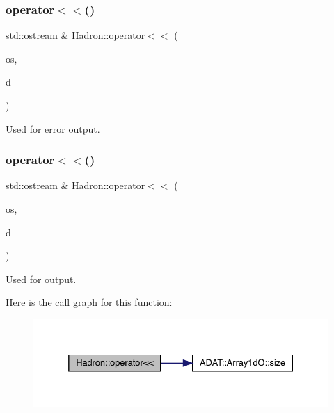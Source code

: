 \subsubsection{\texorpdfstring{operator$<$$<$()}{operator<<()}\hspace{0.1cm}{\footnotesize\ttfamily [25/48]}}
{\footnotesize\ttfamily std\+::ostream \& Hadron\+::operator$<$$<$ (\begin{DoxyParamCaption}\item[{std\+::ostream \&}]{os,  }\item[{const \mbox{\hyperlink{structHadron_1_1KeyGlueElementalOperator__t}{Key\+Glue\+Elemental\+Operator\+\_\+t}} \&}]{d }\end{DoxyParamCaption})}



Used for error output. 

\mbox{\label{namespaceHadron_a43b2528d47caea41d1eca554b9106b9c}} 
\subsubsection{\texorpdfstring{operator$<$$<$()}{operator<<()}\hspace{0.1cm}{\footnotesize\ttfamily [26/48]}}
{\footnotesize\ttfamily std\+::ostream \& Hadron\+::operator$<$$<$ (\begin{DoxyParamCaption}\item[{std\+::ostream \&}]{os,  }\item[{const \mbox{\hyperlink{classADAT_1_1Array1dO}{Array1dO}}$<$ \mbox{\hyperlink{structHadron_1_1KeyHadronNPartIrrepOp__t_1_1CGPair__t}{Key\+Hadron\+N\+Part\+Irrep\+Op\+\_\+t\+::\+C\+G\+Pair\+\_\+t}} $>$ \&}]{d }\end{DoxyParamCaption})}



Used for output. 

Here is the call graph for this function\+:
\nopagebreak
\begin{figure}[H]
\begin{center}
\leavevmode
\includegraphics[width=332pt]{d1/daf/namespaceHadron_a43b2528d47caea41d1eca554b9106b9c_cgraph}
\end{center}
\end{figure}
\mbox{\label{namespaceHadron_a7065bb8b0e72a1c7d300230e08cdfdde}} 
